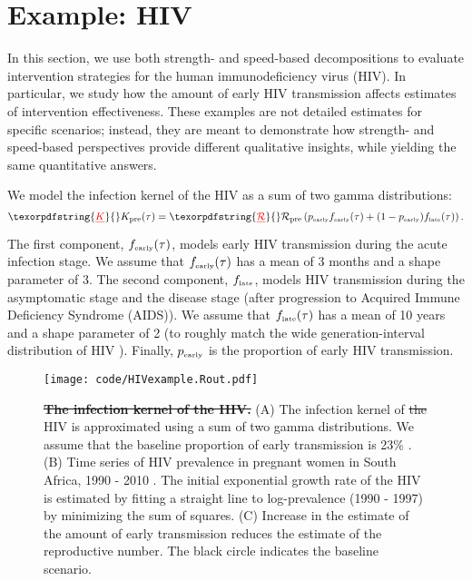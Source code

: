 \documentclass[12pt]{article}
\newcommand{\RR}{\ensuremath{{\mathcal R}}}
\newcommand{\Rx}[1]{\ensuremath{\RR_{\mathrm{#1}}}} %
\newcommand{\Rpre}{\Rx{pre}} %
\newcommand{\KK}{\ensuremath{{K}}} %
\newcommand{\Kx}[1]{\ensuremath{\KK_{\mathrm{#1}}}} %
\newcommand{\Kpre}{\Kx{pre}} %
\newcommand{\tsub}[2]{#1_{{\textrm{\tiny #2}}}}
\newcommand{\figlab}[1]{\label{fig:#1}}
\providecommand{\DIFaddtex}[1]{{\protect\color{blue}\uwave{#1}}} %
\providecommand{\DIFdeltex}[1]{{\protect\color{red}\sout{#1}}}                      %
\providecommand{\DIFaddbegin}{} %
\providecommand{\DIFaddend}{} %
\providecommand{\DIFdelbegin}{} %
\providecommand{\DIFdelend}{} %
\providecommand{\DIFaddFL}[1]{\DIFadd{#1}} %
\providecommand{\DIFdelFL}[1]{\DIFdel{#1}} %
\providecommand{\DIFaddbeginFL}{} %
\providecommand{\DIFaddendFL}{} %
\providecommand{\DIFdelbeginFL}{} %
\providecommand{\DIFdelendFL}{} %
\providecommand{\DIFadd}[1]{\texorpdfstring{\DIFaddtex{#1}}{#1}} %
\providecommand{\DIFdel}[1]{\texorpdfstring{\DIFdeltex{#1}}{}} %
\newcommand{\DIFscaledelfig}{0.5}
\newlength{\DIFdelgraphicswidth} %
\newlength{\DIFdelgraphicsheight} %
\newcommand{\DIFaddincludegraphics}[2][]{{\color{blue}\fbox{\DIFOincludegraphics[#1]{#2}}}} %
\newcommand{\DIFdelincludegraphics}[2][]{%
\sbox{\DIFdelgraphicsbox}{\DIFOincludegraphics[#1]{#2}}%
\settoboxwidth{\DIFdelgraphicswidth}{\DIFdelgraphicsbox} %
\settoboxtotalheight{\DIFdelgraphicsheight}{\DIFdelgraphicsbox} %
\scalebox{\DIFscaledelfig}{%
\parbox[b]{\DIFdelgraphicswidth}{\usebox{\DIFdelgraphicsbox}\\[-\baselineskip] \rule{\DIFdelgraphicswidth}{0em}}\llap{\resizebox{\DIFdelgraphicswidth}{\DIFdelgraphicsheight}{%
\setlength{\unitlength}{\DIFdelgraphicswidth}%
\begin{picture}(1,1)%
\thicklines\linethickness{2pt} %
{\color[rgb]{1,0,0}\put(0,0){\framebox(1,1){}}}%
{\color[rgb]{1,0,0}\put(0,0){\line( 1,1){1}}}%
{\color[rgb]{1,0,0}\put(0,1){\line(1,-1){1}}}%
\end{picture}%
}\hspace*{3pt}}} %
} %
\DeclareRobustCommand{\DIFaddbegin}{\DIFOaddbegin \let\includegraphics\DIFaddincludegraphics} %
\DeclareRobustCommand{\DIFaddend}{\DIFOaddend \let\includegraphics\DIFOincludegraphics} %
\DeclareRobustCommand{\DIFdelbegin}{\DIFOdelbegin \let\includegraphics\DIFdelincludegraphics} %
\DeclareRobustCommand{\DIFdelend}{\DIFOaddend \let\includegraphics\DIFOincludegraphics} %
\DeclareRobustCommand{\DIFaddbeginFL}{\DIFOaddbeginFL \let\includegraphics\DIFaddincludegraphics} %
\DeclareRobustCommand{\DIFaddendFL}{\DIFOaddendFL \let\includegraphics\DIFOincludegraphics} %
\DeclareRobustCommand{\DIFdelbeginFL}{\DIFOdelbeginFL \let\includegraphics\DIFdelincludegraphics} %
\DeclareRobustCommand{\DIFdelendFL}{\DIFOaddendFL \let\includegraphics\DIFOincludegraphics} %
\begin{document}
\section{Example: HIV}

In this section, we use both strength- and speed-based decompositions to evaluate intervention strategies for the human immunodeficiency virus (HIV). 
In particular, we study how the amount of early HIV transmission affects estimates of intervention effectiveness. 
These examples are not detailed estimates for specific scenarios; 
instead, they are meant to demonstrate how strength- and speed-based perspectives provide different qualitative insights, while yielding the same quantitative answers.

We model the \DIFaddbegin \DIFadd{pre-intervention }\DIFaddend infection kernel of the HIV as a sum of two gamma distributions:
\begin{equation}
\DIFdelbegin \DIFdel{K}\DIFdelend \DIFaddbegin \Kpre\DIFaddend (\tau) = \DIFdelbegin \DIFdel{\mathcal R }\DIFdelend \DIFaddbegin \Rpre \DIFaddend \left(\tsub{p}{early} \tsub{f}{early}(\tau) + (1-\tsub{p}{early}) \tsub{f}{late}(\tau) \right).
\end{equation}
The first component, $\tsub{f}{early}(\tau)$, models early HIV transmission during the acute infection stage.
We assume that $\tsub{f}{early}(\tau)$ has a mean of 3 months \citep{hollingsworth2008hiv} and a shape parameter of 3.
The second component, $\tsub{f}{late}$, models HIV transmission during the asymptomatic stage and the disease stage (after progression to Acquired Immune Deficiency Syndrome (AIDS)).
We assume that $\tsub{f}{late}(\tau)$ has a mean of 10 years \citep{brookmeyer1989censoring, nishiura2019estimating} and a shape parameter of 2 (to roughly match the wide generation-interval distribution of HIV \citep{fraser2004factors}).
Finally, $\tsub{p}{early}$ is the proportion of early HIV transmission.

\begin{figure}[!th]
\texttt{[image: code/HIVexample.Rout.pdf]}
\caption{
\DIFdelbeginFL \textbf{\DIFdelFL{The infection kernel of the HIV.}}
\DIFdelendFL \DIFaddbeginFL \textbf{\DIFaddFL{The infection kernel of HIV.}}
\DIFaddendFL (A) The infection kernel of \DIFdelbeginFL \DIFdelFL{the }\DIFdelendFL HIV is approximated using a sum of two gamma distributions. We assume that the baseline proportion of early transmission is 23\% \citep{hayes2006amplified}.
(B) Time series of HIV prevalence in pregnant women in South Africa, 1990 - 2010 \citep{barron2013eliminating}. The initial exponential growth rate of the HIV is estimated by fitting a straight line to log-prevalence (1990 - 1997) by minimizing the sum of squares.
(C) Increase in the estimate of the amount of early transmission reduces the estimate of the reproductive number.
The black circle indicates the baseline scenario.
}
\figlab{example}
\end{figure}
\end{document}
